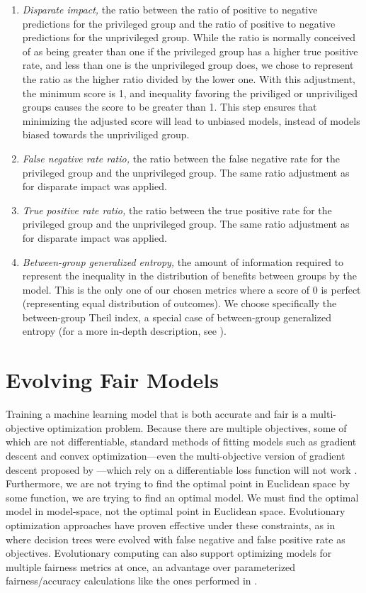 \documentclass{elsarticle}
\begin{document}
\begin{enumerate}
	\item \textit{Disparate impact,} the ratio between the ratio of positive to negative predictions for the privileged group and the ratio of positive to negative predictions for the unprivileged group. While the ratio is normally conceived of as being greater than one if the privileged group has a higher true positive rate, and less than one is the unprivileged group does, we chose to represent the ratio as the higher ratio divided by the lower one. With this adjustment, the minimum score is 1, and inequality favoring the priviliged or unpriviliged groups causes the score to be greater than 1. This step ensures that minimizing the adjusted score will lead to unbiased models, instead of models biased towards the unpriviliged group.
	\item \textit{False negative rate ratio,} the ratio between the false negative rate for the privileged group and the unprivileged group. The same ratio adjustment as for disparate impact was applied.
	\item \textit{True positive rate ratio,} the ratio between the true positive rate for the privileged group and the unprivileged group. The same ratio adjustment as for disparate impact was applied.
	\item \textit{Between-group generalized entropy,} the amount of information required to represent the inequality in the distribution of benefits between groups by the model. This is the only one of our chosen metrics where a score of 0 is perfect (representing equal distribution of outcomes). We choose specifically the between-group Theil index, a special case of between-group generalized entropy (for a more in-depth description, see \cite{Speicher:2018}).
\end{enumerate}

\section{Evolving Fair Models}
Training a machine learning model that is both accurate and fair is a multi-objective optimization problem. Because there are multiple objectives, some of which are not differentiable, standard methods of fitting models such as gradient descent and convex optimization---even the multi-objective version of gradient descent proposed by \citep{Desideri:2012}---which rely on a differentiable loss function will not work \citep{Zerbinati:2011}. Furthermore, we are not trying to find the optimal point in Euclidean space by some function, we are trying to find an optimal model. We must find the optimal model in model-space, not the optimal point in Euclidean space. Evolutionary optimization approaches have proven effective under these constraints, as in \citep{Zhao:2007} where decision trees were evolved with false negative and false positive rate as objectives. Evolutionary computing can also support optimizing models for multiple fairness metrics at once, an advantage over parameterized fairness/accuracy calculations like the ones performed in \citep{Friedler:2019}. 
\end{document}
